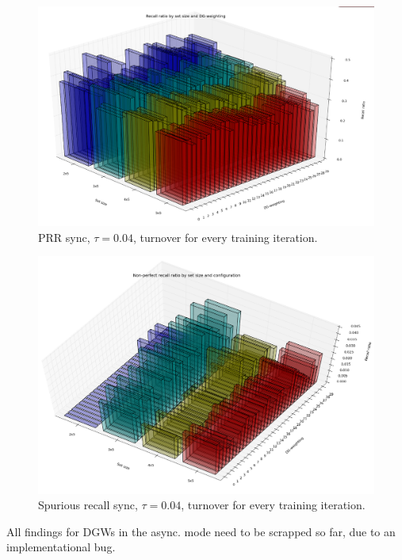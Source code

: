 \begin{figure}
    \centering
    \includegraphics[width=13cm]{fig/3d_perfect_recall_by_set_size_and_dgw_sync_tr_004_tm1}
    \caption{PRR sync, $\tau=0.04$, turnover for every training iteration.}
    \label{fig:3d_perfect_recall_by_set_size_and_dgw_sync_tr_004_tm1}
\end{figure}

\begin{figure}
    \centering
    \includegraphics[width=13cm]{fig/3d_non_perfect_recall_by_set_size_and_dgw_sync_tr_004_tm1_angle_ss}
    \caption{Spurious recall sync, $\tau=0.04$, turnover for every training iteration.}
    \label{fig:3d_non_perfect_recall_by_set_size_and_dgw_sync_tr_004_tm1_angle_ss}
\end{figure}

All findings for DGWs in the async. mode need to be scrapped so far, due to an implementational bug.

